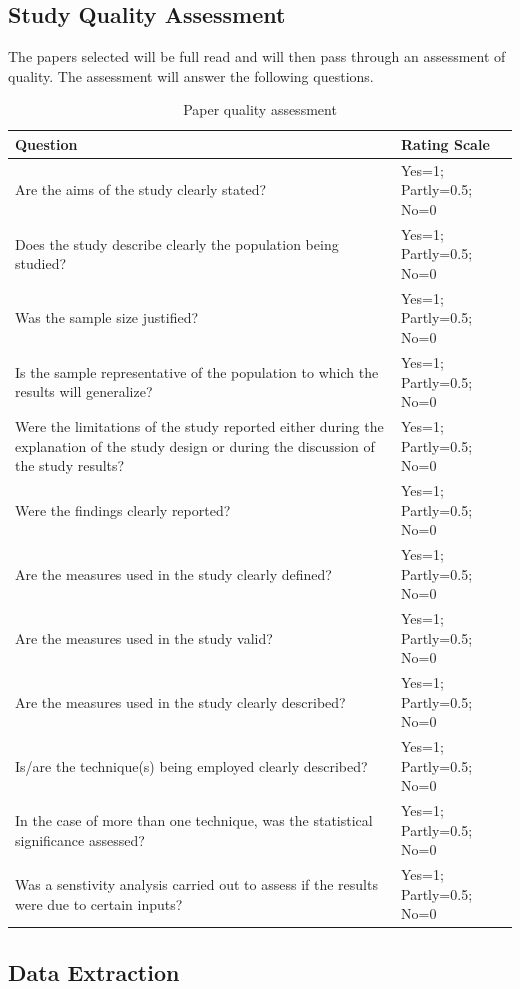 \documentclass[12pt]{article}
\begin{document}
\subsection{Study Quality Assessment}
The papers selected will be full read and will then pass through an assessment of quality. The assessment will answer the following questions. 
\begin{table}
	\begin{tabular}{ p{6cm} | p{6cm} }
	\hline
	Question & Rating Scale \\ \hline
	Are the aims of the study clearly stated? & Yes=1; Partly=0.5; No=0 \\ \hline
	Does the study describe clearly the population being studied? & Yes=1; Partly=0.5; No=0 \\ \hline
	Was the sample size justified? & Yes=1; Partly=0.5; No=0 \\ \hline
	Is the sample representative of the population to which the results will generalize? & Yes=1; Partly=0.5; No=0 \\ \hline
	Were the limitations of the study reported either during the explanation of the study design or during the discussion of the study results? & Yes=1; Partly=0.5; No=0 \\ \hline
	Were the findings clearly reported? & Yes=1; Partly=0.5; No=0 \\ \hline
	\hline
	Are the measures used in the study clearly defined? & Yes=1; Partly=0.5; No=0 \\ \hline
	Are the measures used in the study valid? & Yes=1; Partly=0.5; No=0 \\ \hline
	Are the measures used in the study clearly described? & Yes=1; Partly=0.5; No=0 \\ \hline
	\hline
	Is/are the technique(s) being employed clearly described? & Yes=1; Partly=0.5; No=0 \\ \hline
	In the case of more than one technique, was the statistical significance assessed? & Yes=1; Partly=0.5; No=0 \\ \hline
	Was a senstivity analysis carried out to assess if the results were due to certain inputs? & Yes=1; Partly=0.5; No=0 \\ \hline
	\end{tabular}
	\caption[Table caption text]{Paper quality assessment}
	\label{table:name}
\end{table}




\subsection{Data Extraction}
\end{document}
